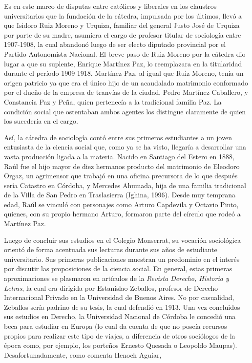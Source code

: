 Es en este marco de disputas entre católicos y liberales en los claustros universitarios que la fundación de la cátedra, impulsada por los últimos, llevó a que Isidoro Ruiz Moreno y Urquiza, familiar del general Justo José de Urquiza por parte de su madre, asumiera el cargo de profesor titular de sociología entre 1907-1908, la cual abandonó luego de ser electo diputado provincial por el Partido Autonomista Nacional. El breve paso de Ruiz Moreno por la cátedra dio lugar a que su suplente, Enrique Martínez Paz, lo reemplazara en la titularidad durante el período 1909-1918. Martínez Paz, al igual que Ruiz Moreno, tenía un origen patricio ya que era el único hijo de un acaudalado matrimonio conformado por el dueño de la empresa de tranvías de la ciudad, Pedro Martínez Caballero, y Constancia Paz y Peña, quien pertenecía a la tradicional familia Paz. La condición social que ostentaban ambos agentes los distingue claramente de quien los sucedería en el cargo.

Así, la cátedra de sociología contó entre sus primeros estudiantes a un joven entusiasta de la ciencia social que, como ya se ha visto, llegaría a desarrollar una vasta producción ligada a la materia. Nacido en Santiago del Estero en 1888, Raúl fue el hijo mayor de diez hermanos producto del matrimonio de Eleodoro Orgaz, un agrimensor que trabajó en una oficina precursora de lo que después sería Catastro en Córdoba, y Mercedes Ahumada, hija de una familia tradicional de la Villa de San Pedro en Traslasierra (Ighina, 1996). Desde muy temprana edad, Raúl se vinculó con personajes como Arturo Capdevila y Octavio Pinto, quienes, con su propio hermano Arturo, formaron parte del círculo que rodeó a Martínez Paz.

Luego de concluir sus estudios en el Colegio Monserrat, su vocación sociológica orientó de forma acentuada sus lecturas durante sus años de estudiante universitario. Sus primeras publicaciones muestran un predominio en el interés por discutir las proposiciones de la ciencia social. En general, estas primeras aproximaciones se plasmaron en artículos de la \emph{Revista Derecho, Historia y Letras}, la cual era dirigida por Estanislao Zeballos, profesor de Derecho Internacional Privado en la Universidad de Buenos Aires. No por casualidad, Zeballos sería padrino de su tesis, la cual defendió en 1913. Una vez concluidos sus estudios en Derecho, la Universidad Nacional de Córdoba le concedió una beca para estudiar en Europa (lo cual da cuenta de que no poseía recursos propios para realizar este tipo de viajes, a diferencia de otros sociólogos de la época como, por ejemplo, los porteños Ernesto Quesada o Leopoldo Maupas). Desafortunadamente, como comenta Henoch Aguiar,

